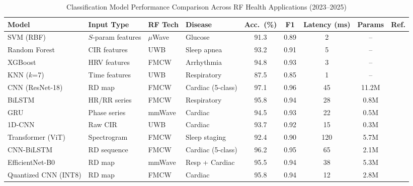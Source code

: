\documentclass[journal,twoside]{IEEEtran}
\begin{document}
\begin{table}[!t]
\centering
\caption{Classification Model Performance Comparison Across RF Health Applications (2023--2025)}
\label{tab:model_comparison}
\small
\begin{tabular}{@{}llllccccl@{}}
\toprule
\textbf{Model} & \textbf{Input Type} & \textbf{RF Tech} & \textbf{Disease} & \textbf{Acc.\ (\%)} & \textbf{F1} & \textbf{Latency (ms)} & \textbf{Params} & \textbf{Ref.} \\
\midrule
SVM (RBF) & $S$-param features & $\mu$Wave & Glucose & 91.3 & 0.89 & 2 & -- & \cite{ref_noninvasive_glucose2025} \\
Random Forest & CIR features & UWB & Sleep apnea & 93.2 & 0.91 & 5 & -- & \cite{ref_uwb_overview2024} \\
XGBoost & HRV features & FMCW & Arrhythmia & 94.8 & 0.93 & 3 & -- & \cite{ref_mmwave_arrhythmia2023} \\
KNN ($k$=7) & Time features & UWB & Respiratory & 87.5 & 0.85 & 1 & -- & \cite{ref_haptic_stress2023} \\
CNN (ResNet-18) & RD map & FMCW & Cardiac (5-class) & 97.1 & 0.96 & 45 & 11.2M & \cite{ref_comprehensive_dataset2024} \\
BiLSTM & HR/RR series & FMCW & Respiratory & 95.8 & 0.94 & 28 & 0.8M & \cite{ref_wearable_cardio2025} \\
GRU & Phase series & mmWave & Cardiac & 94.5 & 0.93 & 22 & 0.5M & \cite{ref_mmwave_vital2025} \\
1D-CNN & Raw CIR & UWB & Cardiac & 93.7 & 0.92 & 15 & 0.3M & \cite{ref_infant_monitor2025} \\
Transformer (ViT) & Spectrogram & FMCW & Sleep staging & 92.4 & 0.90 & 120 & 5.7M & \cite{ref_mlrf_sensing2025} \\
CNN-BiLSTM & RD sequence & FMCW & Cardiac (5-class) & 96.2 & 0.95 & 65 & 2.1M & \cite{ref_multiscenario_mimo2025} \\
EfficientNet-B0 & RD map & mmWave & Resp + Cardiac & 95.5 & 0.94 & 38 & 5.3M & \cite{ref_highprec_mmwave2024} \\
Quantized CNN (INT8) & RD map & FMCW & Cardiac & 95.8 & 0.94 & 12 & 2.8M & \cite{ref_biogap2025} \\
\bottomrule
\end{tabular}
\end{table}
\end{document}

